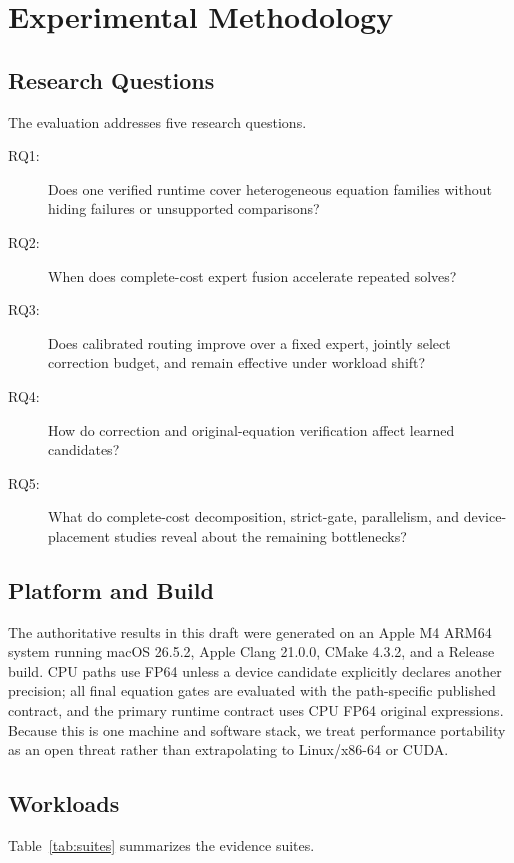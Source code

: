 \section{Experimental Methodology}
\label{sec:methodology}

\subsection{Research Questions}

The evaluation addresses five research questions.

\begin{description}
  \item[RQ1:] Does one verified runtime cover heterogeneous equation families
  without hiding failures or unsupported comparisons?
  \item[RQ2:] When does complete-cost expert fusion accelerate repeated solves?
  \item[RQ3:] Does calibrated routing improve over a fixed expert, jointly select
  correction budget, and remain effective under workload shift?
  \item[RQ4:] How do correction and original-equation verification affect learned
  candidates?
  \item[RQ5:] What do complete-cost decomposition, strict-gate, parallelism, and
  device-placement studies reveal about the remaining bottlenecks?
\end{description}

\subsection{Platform and Build}

The authoritative results in this draft were generated on an Apple M4 ARM64 system
running macOS 26.5.2, Apple Clang 21.0.0, CMake 4.3.2, and a Release build. CPU
paths use FP64 unless a device candidate explicitly declares another precision;
all final equation gates are evaluated with the path-specific published contract,
and the primary runtime contract uses CPU FP64 original expressions. Because this
is one machine and software stack, we treat performance portability as an open
threat rather than extrapolating to Linux/x86-64 or CUDA.

\subsection{Workloads}

Table~\ref{tab:suites} summarizes the evidence suites.

